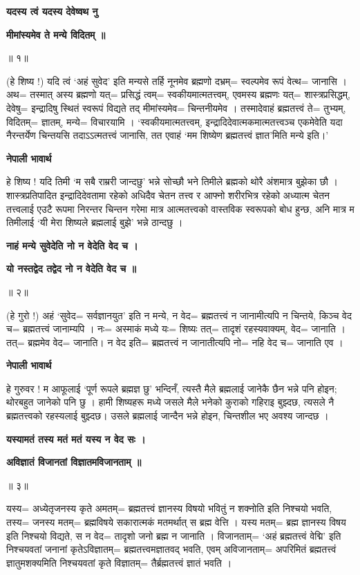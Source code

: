 \documentclass[11pt, a5paper]{article}
\begin{document}
\textbf{यदस्य त्वं यदस्य देवेष्वथ नु}

\textbf{मीमांस्यमेव ते मन्ये विदितम् ॥}

॥ १॥

(हे शिष्य !) यदि त्वं ‘अहं सुवेद’ इति मन्यसे तर्हि नूनमेव ब्रह्मणो दभ्रम्= स्वल्पमेव रूपं वेत्थ= जानासि । अथ= तस्मात् अस्य ब्रह्मणो यत्= प्रसिद्धं त्वम्= स्वकीयमात्मतत्त्वम्, एवमस्य ब्रह्मणः यत्= शास्त्रप्रसिद्धम्, देवेषु= इन्द्रादिषु स्थितं स्वरूपं विद्यते तद् मीमांस्यमेव= चिन्तनीयमेव । तस्मादेवाहं ब्रह्मतत्त्वं ते‍= तुभ्यम्, विदितम्= ज्ञातम्, मन्ये= विचारयामि । ‘स्वकीयमात्मतत्त्वम्, इन्द्रादिदेवात्मकमात्मतत्त्वञ्च एकमेवेति यदा नैरन्तर्येण चिन्तयसि तदाऽऽत्मतत्त्वं जानासि, तत एवाहं ‘मम शिष्येण ब्रह्मतत्त्वं ज्ञात’मिति मन्ये इति।’

\textbf{नेपाली भावार्थ}

हे शिष्य ! यदि तिमी ‘म सबै राम्ररी जान्दछु’ भन्ने सोच्छौ भने तिमीले ब्रह्मको थोरै अंशमात्र बुझेका छौ । शास्त्रप्रतिपादित इन्द्रादिदेवतामा रहेको अधिदैव चेतन तत्त्व र आफ्नो शरीरभित्र रहेको अध्यात्म चेतन तत्त्वलाई एउटै रूपमा निरन्तर चिन्तन गरेमा मात्र आत्मतत्त्वको वास्तविक स्वरूपको बोध हुन्छ, अनि मात्र म तिमीलाई ‘यी मेरा शिष्यले ब्रह्मलाई बुझे’ भन्ने ठान्दछु ।

\textbf{नाहं मन्ये सुवेदेति नो न वेदेति वेद च ।}

\textbf{यो नस्तद्वेद तद्वेद नो न वेदेति वेद च ॥}

॥ २॥

(हे गुरो !) अहं ‘सुवेद= सर्वज्ञानयुत’ इति न मन्ये, न वेद= ब्रह्मतत्त्वं न जानामीत्यपि न चिन्तये, किञ्च वेद च= ब्रह्मतत्त्वं जानाम्यपि । नः= अस्माकं मध्ये यः= शिष्यः तत्= तादृशं रहस्यवाक्यम्, वेद= जानाति । तत्= ब्रह्ममेव वेद= जानाति। न वेद इति= ब्रह्मतत्त्वं न जानातीत्यपि नो= नहि वेद च= जानाति एव ।

\textbf{नेपाली भावार्थ}

हे गुरुवर ! म आफूलाई ‘पूर्ण रूपले ब्रह्मज्ञ छु’ भन्दिनँ, त्यस्तै मैले ब्रह्मलाई जानेकै छैन भन्ने पनि होइन; थोरबहुत  जानेको पनि छु । हामी शिष्यहरू मध्ये जसले मैले भनेको कुराको गहिराइ बुझ्दछ, त्यसले नै ब्रह्मतत्त्वको रहस्यलाई बुझ्दछ। उसले ब्रह्मलाई जान्दैन भन्ने होइन, चिन्तशील भए अवश्य जान्दछ ।

\textbf{यस्यामतं तस्य मतं मतं यस्य न वेद सः ।}

\textbf{अविज्ञातं  विजानतां विज्ञातमविजानताम् ॥}

॥ ३॥

यस्य= अध्येतृजनस्य कृते अमतम्= ब्रह्मतत्त्वं ज्ञानस्य विषयो भवितुं न शक्नोति इति निश्चयो भवति, तस्य= जनस्य मतम्= ब्रह्मविषये सकारात्मकं मतमर्थात् स ब्रह्म वेत्ति । यस्य मतम्= ब्रह्म ज्ञानस्य विषय इति निश्चयो विद्यते, स न वेद= तादृशो जनो ब्रह्म न जानाति । विजानताम्= ‘अहं ब्रह्मतत्त्वं वेद्मि’ इति निश्चयवतां जनानां कृतेऽविज्ञातम्= ब्रह्मतत्त्वमज्ञातवद् भवति, एवम् अविजानताम्= अपरिमितं ब्रह्मतत्त्वं ज्ञातुमशक्यमिति निश्चयवतां कृते विज्ञातम्= तैर्ब्रह्मतत्त्वं ज्ञातं भवति ।
\end{document}
